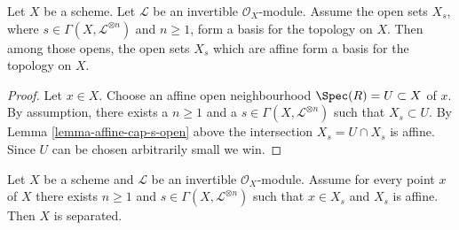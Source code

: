 \begin{lemma}
\label{lemma-affine-s-opens}
Let $X$ be a scheme. Let $\mathcal{L}$ be an invertible $\mathcal{O}_X$-module.
Assume the open sets $X_s$, where $s \in \Gamma(X, \mathcal{L}^{\otimes n})$
and $n \geq 1$, form a basis for the topology on $X$.
Then among those opens, the open sets $X_s$ which are affine
form a basis for the topology on $X$.
\end{lemma}

\begin{proof}
Let $x \in X$. Choose an affine open neighbourhood
$\Spec(R) = U \subset X$ of $x$.
By assumption, there exists
a $n \geq 1$ and a $s \in \Gamma(X, \mathcal{L}^{\otimes n})$
such that $X_s \subset U$. By Lemma \ref{lemma-affine-cap-s-open} above
the intersection $X_s = U \cap X_s$ is affine.
Since $U$ can be chosen arbitrarily small we win.
\end{proof}

\begin{lemma}
\label{lemma-affine-s-opens-cover-quasi-separated}
Let $X$ be a scheme and $\mathcal{L}$ be an invertible $\mathcal{O}_X$-module.
Assume for every point $x$ of $X$ there exists $n \geq 1$ and
$s \in \Gamma(X, \mathcal{L}^{\otimes n})$ such that
$x \in X_s$ and $X_s$ is affine. Then $X$ is separated.
\end{lemma}

